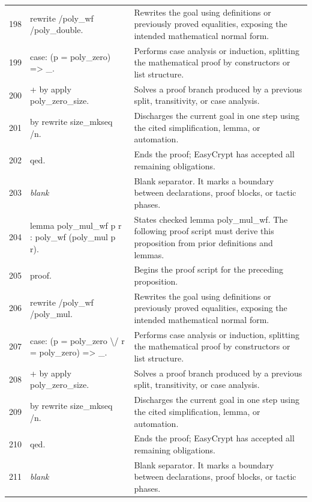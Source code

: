 \documentclass[10pt]{article}
\begin{document}
\begin{longtable}{r L{0.53\textwidth} L{0.37\textwidth}}
198 & {\ttfamily\scriptsize rewrite /poly\_wf /poly\_double.} & Rewrites the goal using definitions or previously proved equalities, exposing the intended mathematical normal form. \\
199 & {\ttfamily\scriptsize case: (p = poly\_zero) => \_.} & Performs case analysis or induction, splitting the mathematical proof by constructors or list structure. \\
200 & {\ttfamily\scriptsize + by apply poly\_zero\_size.} & Solves a proof branch produced by a previous split, transitivity, or case analysis. \\
201 & {\ttfamily\scriptsize by rewrite size\_mkseq /n.} & Discharges the current goal in one step using the cited simplification, lemma, or automation. \\
202 & {\ttfamily\scriptsize qed.} & Ends the proof; EasyCrypt has accepted all remaining obligations. \\
203 & {\ttfamily\scriptsize \emph{blank}} & Blank separator.  It marks a boundary between declarations, proof blocks, or tactic phases. \\
204 & {\ttfamily\scriptsize lemma poly\_mul\_wf p r : poly\_wf (poly\_mul p r).} & States checked lemma poly\_mul\_wf.  The following proof script must derive this proposition from prior definitions and lemmas. \\
205 & {\ttfamily\scriptsize proof.} & Begins the proof script for the preceding proposition. \\
206 & {\ttfamily\scriptsize rewrite /poly\_wf /poly\_mul.} & Rewrites the goal using definitions or previously proved equalities, exposing the intended mathematical normal form. \\
207 & {\ttfamily\scriptsize case: (p = poly\_zero \textbackslash{}/ r = poly\_zero) => \_.} & Performs case analysis or induction, splitting the mathematical proof by constructors or list structure. \\
208 & {\ttfamily\scriptsize + by apply poly\_zero\_size.} & Solves a proof branch produced by a previous split, transitivity, or case analysis. \\
209 & {\ttfamily\scriptsize by rewrite size\_mkseq /n.} & Discharges the current goal in one step using the cited simplification, lemma, or automation. \\
210 & {\ttfamily\scriptsize qed.} & Ends the proof; EasyCrypt has accepted all remaining obligations. \\
211 & {\ttfamily\scriptsize \emph{blank}} & Blank separator.  It marks a boundary between declarations, proof blocks, or tactic phases. \\

\end{longtable}
\end{document}
